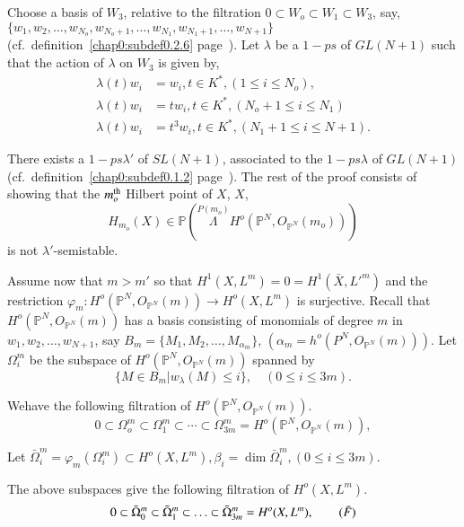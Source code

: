 {\noindent
Choose a basis of $W_3$, relative to the filtration $0 \subset W_o
\subset W_1 \subset W_3$, say, $\{ w_1, w_2, \ldots , w_{N_o}, 
w_{N_o+1}, \ldots , w_{N_1},  w_{N_1+1}, \ldots, w_{N+1} \}$
(cf.\ definition~\ref{chap0:subdef0.2.6} 
page~\pageref{chap0:subdef0.2.6}). Let $\lambda$ be a $1-ps$ of 
$GL(N+1)$ such that the action of $\lambda$ on $W_3$ is given by, 
\begin{align*}
 \lambda (t) w_i  & =  w_i,  t \in K^*,  (1 \le i \le N_o),\\
 \lambda (t) w_i  & =  t w_i,  t \in K^*,  (N_o + 1 \le i \le N_1)\\
 \lambda (t) w_i  & =  t^3w_i,  t \in K^*,  (N_1 + 1 \le i \le N+1).
\end{align*}

There exists a $1-ps \lambda'$ of $SL(N+1)$, associated to the
$1-ps \lambda$ of $GL(N+1)$ (cf.\ definition~\ref{chap0:subdef0.1.2}
page~\pageref{chap0:subdef0.1.2}). The
rest of the proof consists of showing that the $m_o^{\rm th}$ Hilbert
point of $X$, $X$, 
$$H_{m_o}(X) \in \mathbb{P} ( \overset {P
  (m_o)}{\Lambda} H^o (\mathbb{P}^N, O_{\mathbb{P}^N}(m_o)))$$ 
is not $\lambda'$-semistable. 

Assume now that $m > m'$ so that $H^1 (X, L^m) = 0 = H^1 (\bar{X},
L'^m)$ and the restriction $\varphi_m : H^o (\mathbb{P}^N,
O_{\mathbb{P}^N} (m)) \to H^o (X, L^m)$ is surjective. Recall that
$H^o (\mathbb{P}^N, O_{\mathbb{P}^N}(m))$ has a basis consisting of
monomials of degree $m$ in $w_1, w_2, \ldots , w_{N+1}$, say $B_m = \{
M_1, M_2, \ldots , M_{\alpha_m}\}$, $(\alpha_m = h^o (P^N,
O_{\mathbb{P}^N} (m)))$. Let $\Omega^m_i$ be the subspace of $H^o
(\mathbb{P}^N, O_{\mathbb{P}^N}(m))$ spanned by 
$$\{ M \in B_m
| w_\lambda (M) \le i\},\quad (0 \le i \le 3m).$$ 

We\pageoriginale have the following filtration of $H^o(\mathbb{P}^{N},
O_{\mathbb{P}^{N}} (m))$.  
\begin{equation*} 
0 \subset \Omega^{m}_{o} \subset \Omega^{m}_{1}\subset \cdots \subset
\Omega^{m}_{3 m}  = H^{o}(\mathbb{P}^{N}, O_{\mathbb{P}^{N}} (m)),
\tag{F} 
\end{equation*}

\noindent
Let $\bar{\Omega}^{m}_{i} = \varphi_{m} (\Omega^{m}_{i}) \subset H^o
(X , L^{m}), \beta_{i} = \dim \bar{\Omega}^{m}_{i}, (0 \le i \le
3m)$.  

\noindent 
The above subspaces give the following filtration of $H^o(X, L^{m})$. 
\begin{equation*}
0 \subset \bar{\Omega}^{m}_{0} \subset \bar{\Omega}^{m}_{1} \subset
\ldots \subset \bar{\Omega}^{m}_{3m} = H^o (X, L^{m}),
\tag{$\bar{F}$} 
\end{equation*}

}
